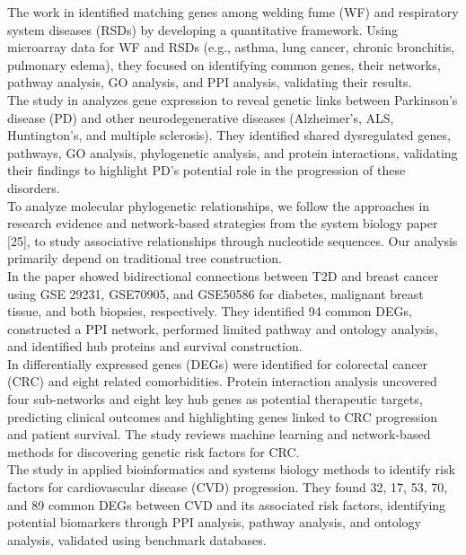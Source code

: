 The work in \cite{b22} identified matching genes among welding fume (WF) and respiratory system diseases (RSDs) by developing a quantitative framework. Using microarray data for WF and RSDs (e.g., asthma, lung cancer, chronic bronchitis, pulmonary edema), they focused on identifying common genes, their networks, pathway analysis, GO analysis, and PPI analysis, validating their results.\\

The study in \cite{b10} analyzes gene expression to reveal genetic links between Parkinson's disease (PD) and other neurodegenerative diseases (Alzheimer's, ALS, Huntington's, and multiple sclerosis). They identified shared dysregulated genes, pathways, GO analysis, phylogenetic analysis, and protein interactions, validating their findings to highlight PD's potential role in the progression of these disorders.\\

To analyze molecular phylogenetic relationships, we follow the approaches in research evidence \cite{b23} and network-based strategies from the system biology paper [25], to study associative relationships through nucleotide sequences. Our analysis primarily depend on traditional tree construction.\\

In \cite{b24} the paper showed bidirectional connections between T2D and breast cancer using GSE 29231, GSE70905, and GSE50586 for diabetes, malignant breast tissue, and both biopsies, respectively. They identified 94 common DEGs, constructed a PPI network, performed limited pathway and ontology analysis, and identified hub proteins and survival construction.\\

In \cite{b27} differentially expressed genes (DEGs) were identified for colorectal cancer (CRC) and eight related comorbidities. Protein interaction analysis uncovered four sub-networks and eight key hub genes as potential therapeutic targets, predicting clinical outcomes and highlighting genes linked to CRC progression and patient survival. The study reviews machine learning and network-based methods for discovering genetic risk factors for CRC.\\

The study in \cite{b30} applied bioinformatics and systems biology methods to identify risk factors for cardiovascular disease (CVD) progression. They found 32, 17, 53, 70, and 89 common DEGs between CVD and its associated risk factors, identifying potential biomarkers through PPI analysis, pathway analysis, and ontology analysis, validated using benchmark databases.\\

